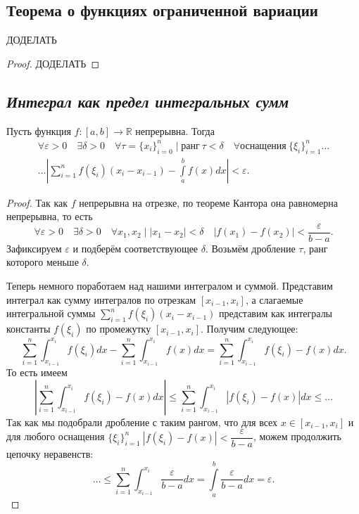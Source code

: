 \subsection{Теорема о функциях ограниченной вариации}

\begin{theorem}
	ДОДЕЛАТЬ
\end{theorem}

\begin{proof}
	ДОДЕЛАТЬ
\end{proof}

\subsection{\itshape Интеграл как предел интегральных сумм}

\begin{theorem}
	Пусть функция \(f \colon [a, b] \to \mathbb{R}\) непрерывна. Тогда
	\begin{gather*}
		\forall \varepsilon > 0 \quad \exists \delta > 0 \quad \forall \tau = \{x_i\}_{i = 0}^n \mid \text{ранг} \ \tau < \delta \quad \forall \text{оснащения} \ \{\xi_i\}_{i = 1}^n \ldots \\
		\ldots \left|\sum_{i = 1}^n f(\xi_i) (x_i - x_{i - 1}) - \int\limits_a^b f(x) dx \right| < \varepsilon.
	\end{gather*}
\end{theorem}

\begin{proof}
	Так как \(f\) непрерывна на отрезке, по теореме Кантора она равномерна непрерывна, то есть \[
		\forall \varepsilon > 0 \quad \exists \delta > 0 \quad \forall x_1, x_2 \mid |x_1 - x_2| < \delta \quad |f(x_1) - f(x_2)| < \frac{\varepsilon}{b - a}.
	\]
	Зафиксируем \(\varepsilon\) и подберём соответствующее \(\delta\). Возьмём дробление \(\tau\), ранг которого меньше \(\delta\).
	
	Теперь немного поработаем над нашими интегралом и суммой. Представим интеграл как сумму интегралов по отрезкам \([x_{i - 1}, x_i]\), а слагаемые интегральной суммы \(\sum\limits_{i = 1}^n f(\xi_i) (x_i - x_{i - 1})\) представим как интегралы константы \(f(\xi_i)\) по промежутку \([x_{i - 1}, x_i]\). Получим следующее: \[
		\sum_{i = 1}^n \int_{x_{i - 1}}^{x_i} f(\xi_i) dx - \sum_{i = 1}^n \int_{x_{i - 1}}^{x_i} f(x) dx = \sum_{i = 1}^n \int_{x_{i - 1}}^{x_i} f(\xi_i) - f(x) dx.
	\]
	То есть имеем \[
		\left|\sum_{i = 1}^n \int_{x_{i - 1}}^{x_i} f(\xi_i) - f(x) dx \right| \leqslant \sum_{i = 1}^n \int_{x_{i - 1}}^{x_i} \left|f(\xi_i) - f(x) \right| dx \leqslant \ldots
	\]
	Так как мы подобрали дробление с таким рангом, что для всех \(x \in [x_{i - 1}, x_i]\) и для любого оснащения \(\{\xi_i\}_{i = 1}^n \ |f(\xi_i) - f(x)| < \dfrac{\varepsilon}{b - a}\), можем продолжить цепочку неравенств: \[
		\ldots \leqslant \sum_{i = 1}^n \int_{x_{i - 1}}^{x_i} \frac{\varepsilon}{b - a} dx = \int\limits_a^b \frac{\varepsilon}{b - a} dx = \varepsilon.
	\]
\end{proof}

